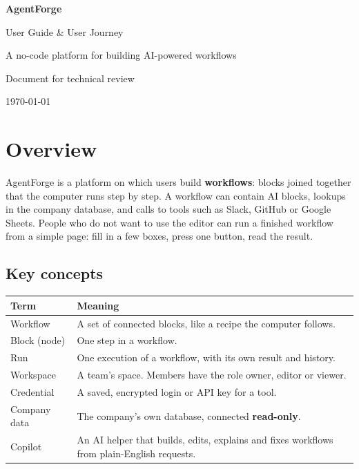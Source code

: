 \documentclass[11pt,a4paper]{article}
\begin{document}
\begin{titlepage}
  \centering
  \vspace*{3cm}
  {\Huge\bfseries\color{brand} AgentForge\par}
  \vspace{0.6cm}
  {\Large User Guide \& User Journey\par}
  \vspace{1.5cm}
  {\large A no-code platform for building AI-powered workflows\par}
  \vfill
  {\large Document for technical review\par}
  \vspace{0.3cm}
  {\large \today}
  \vspace{2cm}
\end{titlepage}

\tableofcontents
\newpage

\section{Overview}

AgentForge is a platform on which users build \textbf{workflows}: blocks joined
together that the computer runs step by step. A workflow can contain AI blocks,
lookups in the company database, and calls to tools such as Slack, GitHub or
Google Sheets. People who do not want to use the editor can run a finished
workflow from a simple page: fill in a few boxes, press one button, read the
result.

\subsection{Key concepts}

\begin{longtable}{@{}L{3.4cm}L{12cm}@{}}
\toprule
\textbf{Term} & \textbf{Meaning} \\
\midrule
\endhead
Workflow & A set of connected blocks, like a recipe the computer follows. \\
Block (node) & One step in a workflow. \\
Run & One execution of a workflow, with its own result and history. \\
Workspace & A team's space. Members have the role owner, editor or viewer. \\
Credential & A saved, encrypted login or API key for a tool. \\
Company data & The company's own database, connected \textbf{read-only}. \\
Copilot & An AI helper that builds, edits, explains and fixes workflows from plain-English requests. \\
\bottomrule
\end{longtable}
\end{document}
